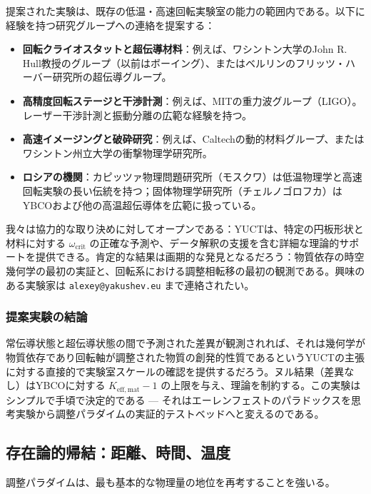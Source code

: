 \documentclass[12pt,a4paper]{article}
\begin{document}
	提案された実験は、既存の低温・高速回転実験室の能力の範囲内である。以下に経験を持つ研究グループへの連絡を提案する：
	\begin{itemize}
		\item \textbf{回転クライオスタットと超伝導材料}：例えば、ワシントン大学のJohn R. Hull教授のグループ（以前はボーイング）、またはベルリンのフリッツ・ハーバー研究所の超伝導グループ。
		\item \textbf{高精度回転ステージと干渉計測}：例えば、MITの重力波グループ（LIGO）。レーザー干渉計測と振動分離の広範な経験を持つ。
		\item \textbf{高速イメージングと破砕研究}：例えば、Caltechの動的材料グループ、またはワシントン州立大学の衝撃物理学研究所。
		\item \textbf{ロシアの機関}：カピッツァ物理問題研究所（モスクワ）は低温物理学と高速回転実験の長い伝統を持つ；固体物理学研究所（チェルノゴロフカ）はYBCOおよび他の高温超伝導体を広範に扱っている。
	\end{itemize}
	
	我々は協力的な取り決めに対してオープンである：YUCTは、特定の円板形状と材料に対する \(\omega_{\text{crit}}\) の正確な予測や、データ解釈の支援を含む詳細な理論的サポートを提供できる。肯定的な結果は画期的な発見となるだろう：物質依存の時空幾何学の最初の実証と、回転系における調整相転移の最初の観測である。興味のある実験家は \texttt{alexey@yakushev.eu} まで連絡されたい。
	
	\subsubsection{提案実験の結論}
	
	常伝導状態と超伝導状態の間で予測された差異が観測されれば、それは幾何学が物質依存であり回転軸が調整された物質の創発的性質であるというYUCTの主張に対する直接的で実験室スケールの確認を提供するだろう。ヌル結果（差異なし）はYBCOに対する \(K_{\mathrm{eff,mat}} - 1\) の上限を与え、理論を制約する。この実験はシンプルで手頃で決定的である — それはエーレンフェストのパラドックスを思考実験から調整パラダイムの実証的テストベッドへと変えるのである。
	
	\subsection{存在論的帰結：距離、時間、温度}
	
	調整パラダイムは、最も基本的な物理量の地位を再考することを強いる。
	
\end{document}
